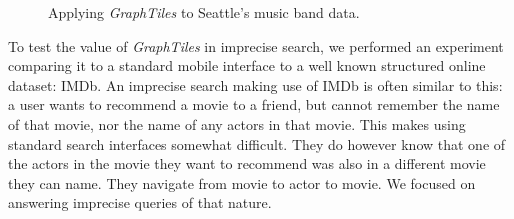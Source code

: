 \begin{figure}[t]
\centering
{}
\caption{Applying \textit{GraphTiles} to Seattle's music band data.}
\label{fig:musicband}
\end{figure}


To test the value of \textit{GraphTiles} in imprecise search, we performed an experiment comparing it to a standard mobile interface to a well known structured online dataset: IMDb. An imprecise search making use of IMDb is often similar to this: a user wants to recommend a movie to a friend, but cannot remember the name of that movie, nor the name of any actors in that movie. This makes using standard search interfaces somewhat difficult. They do however know that one of the actors in the movie they want to recommend was also in a different movie they can name. They navigate from movie to actor to movie. We focused on answering imprecise queries of that nature. 

